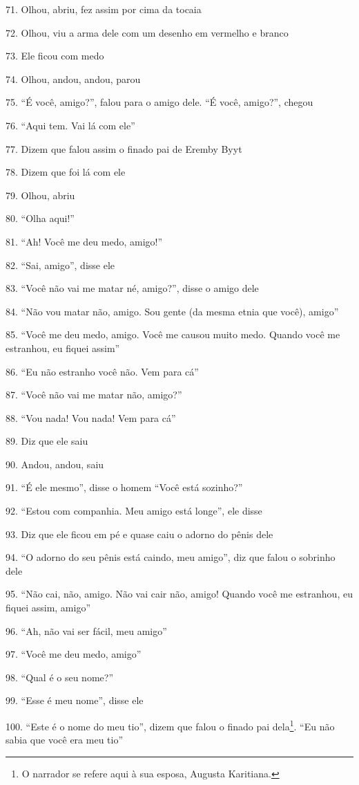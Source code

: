 71. Olhou, abriu, fez assim por cima da tocaia

72. Olhou, viu a arma dele com um desenho em vermelho e branco

73. Ele ficou com medo

74. Olhou, andou, andou, parou

75. ``É você, amigo?'', falou para o amigo dele. ``É você, amigo?'', chegou

76. ``Aqui tem.  Vai lá com ele''

77. Dizem que falou assim o finado pai de Eremby Byyt

78. Dizem que foi lá com ele

79. Olhou, abriu

80. ``Olha aqui!''

81. ``Ah! Você me deu medo, amigo!''

82. ``Sai, amigo'', disse ele

83. ``Você não vai me matar né, amigo?'', disse o amigo dele

84. ``Não vou matar não, amigo. Sou gente (da mesma etnia que você), amigo''

85. ``Você me deu medo, amigo. Você me causou muito medo. Quando você me
estranhou, eu fiquei assim''

86. ``Eu não estranho você não. Vem para cá''

87. ``Você não vai me matar não, amigo?''

88. ``Vou nada! Vou nada! Vem para cá''

89. Diz que ele saiu

90. Andou, andou, saiu

91. ``É ele mesmo'', disse o homem ``Você está sozinho?''

92. ``Estou com companhia. Meu amigo está longe'', ele disse

93. Diz que ele ficou em pé e quase caiu o adorno do pênis dele

94. ``O adorno do seu pênis está caindo, meu amigo'', diz que falou o
sobrinho dele

95. ``Não cai, não, amigo. Não vai cair não, amigo! Quando você me
estranhou, eu fiquei assim, amigo''

96. ``Ah, não vai ser fácil, meu amigo''

97. ``Você me deu medo, amigo''

98. ``Qual é o seu nome?''

99. ``Esse é meu nome'', disse ele

100. ``Este é o nome do meu tio'', dizem que falou o finado pai
dela\footnote{O narrador se refere aqui à sua esposa, Augusta Karitiana.}.
``Eu não sabia que você era meu tio''

